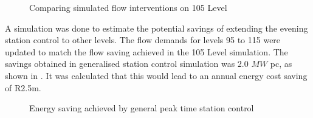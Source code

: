 	\begin{figure}[h!]
		\centering
		
		\caption{Comparing simulated flow interventions on 105 Level}
		\label{fig: Station vs stope}
	\end{figure}
A simulation was done to estimate the potential savings of extending the evening station control to other levels.  The flow demands for levels 95 to 115 were updated to match the flow saving achieved in the 105 Level simulation. The savings obtained in generalised station control simulation was 2.0 $MW$ \gls{pc}, as shown in . It was calculated that this would lead to an annual energy cost saving of R2.5m.
\begin{figure}[h!]
	\centering
	
	\caption{Energy saving achieved by general peak time station control }
	\label{fig: General station optimise}
\end{figure}
